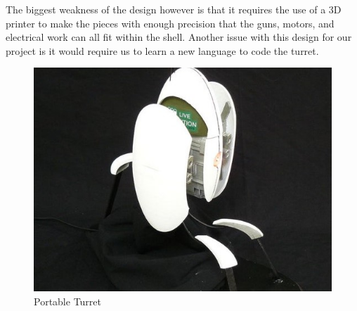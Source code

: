 The biggest weakness of the design however is that it requires the use of a 3D printer to make the pieces with enough precision that the guns, motors, and  electrical work can all fit within the shell. Another issue with this design for our project is it would require us to learn a new language to code the turret.  
\begin{figure}[h!]
    \centering
    \includegraphics[scale=.3]{turret design2.jpg}
    \caption{Portable Turret}
    \label{fig:portable turret}
\end{figure}

